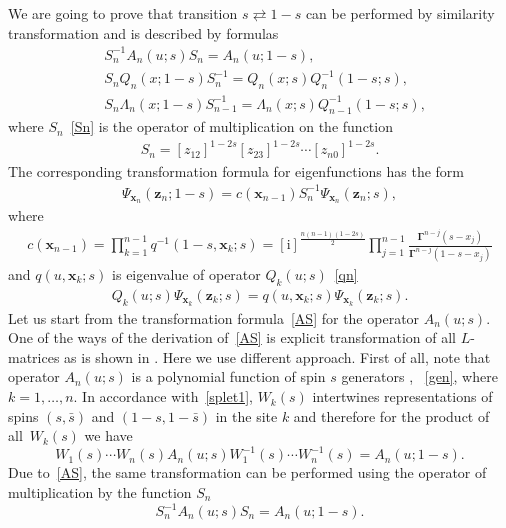 \documentclass[pdftex]{sigma}
\renewcommand{\imath}{\mathrm{i}}
\numberwithin{equation}{section}
\begin{document}
We are going to prove that transition $s \rightleftarrows 1-s$
can be performed by similarity transformation and is described by formulas
\begin{align}\label{AS}
&S^{-1}_n A_n(u;s) S_n = A_n(u;1-s) , \\
\nonumber
&S_n Q_n(x;1-s) S^{-1}_{n} = Q_n(x;s) Q^{-1}_{n}(1-s;s) , \\
\label{SL}
&S_n \Lambda_n(x;1-s) S^{-1}_{n-1} =
\Lambda_n(x;s) Q^{-1}_{n-1}(1-s;s) ,
\end{align}
where $S_n$~\eqref{Sn} is the operator of multiplication on
the function
\begin{align*}
S_n = [z_{12}]^{1-2s} [z_{23}]^{1-2s}
\cdots [z_{n0}]^{1-2s} .
\end{align*}
The corresponding transformation formula for eigenfunctions has the form
\begin{align*}
\Psi_{\bm x_n}(\bm z_n;1-s) = c(\bm x_{n-1})
S^{-1}_n \Psi_{\bm x_n}(\bm z_n;s) ,
\end{align*}
where
\begin{align}\label{cx}
c(\bm x_{n-1}) =
\prod_{k=1}^{n-1} q^{-1}(1-s ,\bm x_{k};s) =
 [\imath]^{\frac{n(n-1)(1-2s)}{2}}
\prod_{j=1}^{n-1}\frac{\mathbf{\Gamma}^{n-j}(s-x_j)}
{\mathbf{\Gamma}^{n-j}(1-s-x_j)}
\end{align}
and $q(u ,\bm x_{k};s)$ is eigenvalue
of operator $Q_k(u;s)$~\eqref{qn}
\begin{align*}
Q_k(u;s) \Psi_{\bm x_k}(\bm z_k;s)
= q(u ,\bm x_{k};s) \Psi_{\bm x_k}(\bm z_k;s) .
\end{align*}
Let us start from the transformation formula~\eqref{AS} for
the operator $A_n(u;s)$.
One of the ways of the derivation of~\eqref{AS} is
explicit transformation of all $L$-matrices
as is shown in \cite{BDM}. Here we use different approach.
First of all, note that operator $A_n(u;s)$ is a polynomial function of spin $s$
generators , ~\eqref{gen}, where $k=1,\dots,n$.
In accordance with~\eqref{splet1}, $W_k(s)$ intertwines representations of spins $(s,\bar{s})$ and $(1-s,1-\bar{s})$ in the site $k$ and therefore
for the product of all~$W_k(s)$ we have
\begin{equation*}
W_1(s)\cdots W_n(s)
A_n(u;s) W^{-1}_1(s)\cdots W^{-1}_n(s) = A_n(u;1-s) .
\end{equation*}
Due to~\eqref{AS}, the same transformation can be performed using the operator of
multiplication by the function $S_n$
\begin{equation*}
S^{-1}_n A_n(u;s) S_n = A_n(u;1-s) .
\end{equation*}
\end{document}

